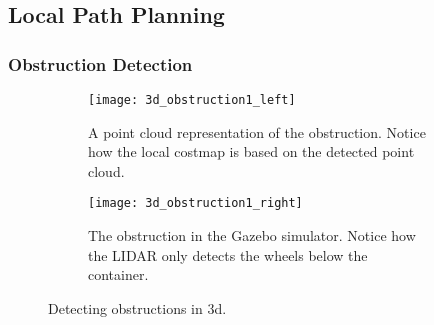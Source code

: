 \subsection{Local Path Planning}

\subsubsection{Obstruction Detection}

\begin{figure}
	\centering
	\begin{subfigure}[b]{0.53\textwidth}
		\texttt{[image: 3d\_obstruction1\_left]}
		\caption{A point cloud representation of the obstruction. Notice how the local costmap is based on the detected point cloud.}
		\label{fig:device_select}
	\end{subfigure}
		\begin{subfigure}[b]{0.45\textwidth}
			\texttt{[image: 3d\_obstruction1\_right]}
			\caption{The obstruction in the Gazebo simulator. Notice how the LIDAR only detects the wheels below the container.}
			\label{fig:bt_request}
		\end{subfigure}
	\caption{\label{fig:3d_obstruction1}Detecting obstructions in 3d.}
\end{figure}